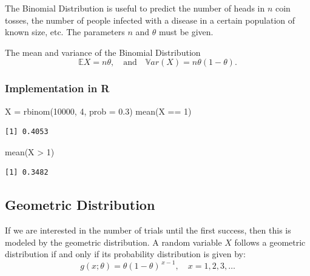 \documentclass[
  letterpaper,
  DIV=11,
  numbers=noendperiod]{scrreprt}
\newenvironment{Shaded}{\begin{snugshade}}{\end{snugshade}}
\newcommand{\AttributeTok}[1]{\textcolor[rgb]{0.40,0.45,0.13}{#1}}
\newcommand{\DecValTok}[1]{\textcolor[rgb]{0.68,0.00,0.00}{#1}}
\newcommand{\FloatTok}[1]{\textcolor[rgb]{0.68,0.00,0.00}{#1}}
\newcommand{\FunctionTok}[1]{\textcolor[rgb]{0.28,0.35,0.67}{#1}}
\newcommand{\NormalTok}[1]{\textcolor[rgb]{0.00,0.23,0.31}{#1}}
\newcommand{\OtherTok}[1]{\textcolor[rgb]{0.00,0.23,0.31}{#1}}
\newcommand{\SpecialCharTok}[1]{\textcolor[rgb]{0.37,0.37,0.37}{#1}}
\begin{document}
The Binomial Distribution is useful to predict the number of heads in
\(n\) coin tosses, the number of people infected with a disease in a
certain population of known size, etc. The parameters \(n\) and
\(\theta\) must be given.

The mean and variance of the Binomial Distribution \[
\mathbb EX = n\theta,\quad \text{and}\quad \mathbb{V}ar(X) = n\theta(1-\theta).\]

\subsubsection{Implementation in R}\label{implementation-in-r-2}

\begin{Shaded}
\begin{Highlighting}[]
\NormalTok{X }\OtherTok{=} \FunctionTok{rbinom}\NormalTok{(}\DecValTok{10000}\NormalTok{, }\DecValTok{4}\NormalTok{, }\AttributeTok{prob =} \FloatTok{0.3}\NormalTok{)}
\FunctionTok{mean}\NormalTok{(X }\SpecialCharTok{==} \DecValTok{1}\NormalTok{)}
\end{Highlighting}
\end{Shaded}

\begin{verbatim}
[1] 0.4053
\end{verbatim}

\begin{Shaded}
\begin{Highlighting}[]
\FunctionTok{mean}\NormalTok{(X }\SpecialCharTok{\textgreater{}} \DecValTok{1}\NormalTok{)}
\end{Highlighting}
\end{Shaded}

\begin{verbatim}
[1] 0.3482
\end{verbatim}

\subsection{Geometric Distribution}\label{geometric-distribution}

If we are interested in the number of trials until the first success,
then this is modeled by the geometric distribution. A random variable
\(X\) follows a geometric distribution if and only if its probability
distribution is given by: \[
g(x;\theta) = \theta (1 - \theta)^{\,x-1}, \quad x = 1,2,3,\ldots
\]
\end{document}
